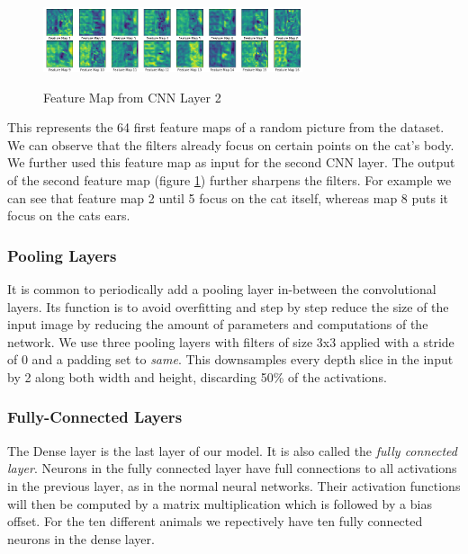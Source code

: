 \documentclass[journal]{IEEEtran}
\begin{document}
\begin{figure}
  \begin{center}
  \includegraphics[width=3in]{photo/feature_map2.png}\\
  \caption{Feature Map from CNN Layer 2}\label{featuremap2}
  \end{center}
\end{figure}

This represents the 64 first feature maps of a random picture from the dataset. We can observe that the filters already focus on certain points on the cat's body. We further used this feature map as input for the second CNN layer. The output of the second feature map (figure \ref{featuremap2}) further sharpens the filters. For example we can see that feature map 2 until 5 focus on the cat itself, whereas map 8 puts it focus on the cats ears. \\

\subsubsection{Pooling Layers}
\noindent It is common to periodically add a pooling layer in-between the convolutional layers. Its function is to avoid overfitting and step by step reduce the size of the input image by reducing the amount of parameters and computations of the network. We use three pooling layers with filters of size 3x3 applied with a stride of 0 and a padding set to \textit{same}. This downsamples every depth slice in the input by 2 along both width and height, discarding 50\% of the activations. \\
\subsubsection{Fully-Connected Layers}
\noindent The Dense layer is the last layer of our model. It is also called the \textit{fully connected layer}. Neurons in the fully connected layer have full connections to all activations in the previous layer, as in the normal neural networks. Their activation functions will then be computed by a matrix multiplication which is followed by a bias offset. 
For the ten different animals we repectively have ten fully connected neurons in the dense layer. \\
\end{document}
